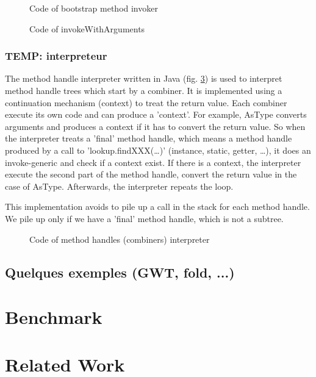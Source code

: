 \documentclass{sigplanconf}
\begin{document}
    \begin{figure}[!h]
      
      \caption{Code of bootstrap method invoker}
      \label{bsm}
    \end{figure}

    \begin{figure}[!h]
      
      \caption{Code of invokeWithArguments}
      \label{IWA}
    \end{figure}

    \subsubsection{TEMP: interpreteur}
    The method handle interpreter written in Java (fig. \ref{intepret}) is used to interpret method handle trees which start by a combiner.
    It is implemented using a continuation mechanism (context) to treat the return value.
    Each combiner execute its own code and can produce a 'context'.
    For example, AsType converts arguments and produces a context if it has to convert the return value.
    So when the interpreter treats a 'final' method handle,
    which means a method handle produced by a call to 'lookup.findXXX(\dots)' (instance, static, getter, \dots),
    it does an invoke-generic and check if a context exist.
    If there is a context, the interpreter execute the second part of the method handle,
    convert the return value in the case of AsType.
    Afterwards, the interpreter repeats the loop.
    
    This implementation avoids to pile up a call in the stack for each method handle.
    We pile up only if we have a 'final' method handle, which is not a subtree.

    \begin{figure}[!h]
      
      \caption{Code of method handles (combiners) interpreter}
      \label{intepret}
    \end{figure}

  \subsection{Quelques exemples (GWT, fold, ...)}

\section{Benchmark}  

\section{Related Work}
\end{document}
